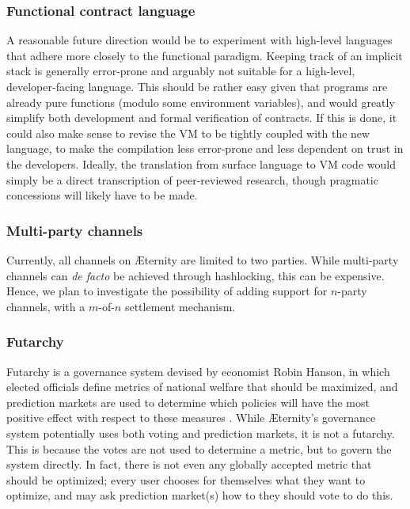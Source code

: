 \documentclass[a4paper, 10pt, conference]{ieeeconf}      %
\begin{document}
\begin{draft}
\subsubsection{Functional contract language}
\begin{draft}
A reasonable future direction would be to experiment with high-level languages that adhere more closely to the functional paradigm. Keeping track of an implicit stack is generally error-prone and arguably not suitable for a high-level, developer-facing language. This should be rather easy given that programs are already pure functions (modulo some environment variables), and would greatly simplify both development and formal verification of contracts. If this is done, it could also make sense to revise the VM to be tightly coupled with the new language, to make the compilation less error-prone and less dependent on trust in the developers. Ideally, the translation from surface language to VM code would simply be a direct transcription of peer-reviewed research, though pragmatic concessions will likely have to be made.
\end{draft}


\subsubsection{Multi-party channels}
Currently, all channels on Æternity are limited to two parties. While multi-party channels can \emph{de facto} be achieved through hashlocking, this can be expensive. Hence, we plan to investigate the possibility of adding support for $n$-party channels, with a $m$-of-$n$ settlement mechanism.

\ifdraft
\subsubsection{Futarchy}
Futarchy is a governance system devised by economist Robin Hanson, in which elected officials define metrics of national welfare that should be maximized, and prediction markets are used to determine which policies will have the most positive effect with respect to these measures \cite{futarchy}. While Æternity's governance system potentially uses both voting and prediction markets, it is not a futarchy. This is because the votes are not used to determine a metric, but to govern the system directly. In fact, there is not even any globally accepted metric that should be optimized; every user chooses for themselves what they want to optimize, and may ask prediction market(s) how to they should vote to do this.
\fi

\end{draft}
\end{document}
